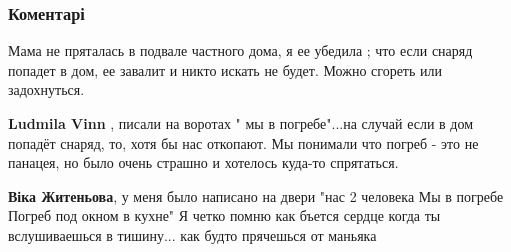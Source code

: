  
 
 
 
 
\subsubsection{Коментарі}
\label{sec:21_07_2021.fb.zhitenjova_vika.1.gorlovka.cmt}

\begin{itemize}
 

Мама не пряталась в подвале частного дома, я ее убедила ; что если снаряд
попадет в дом, ее завалит и никто искать не будет. Можно сгореть или
задохнуться.

\begin{itemize}
 
\textbf{Ludmila Vinn} , писали на воротах " мы в погребе"...на случай если в дом попадёт снаряд, то, хотя бы нас откопают. Мы понимали что погреб - это не панацея, но было очень страшно и хотелось куда-то спрятаться.

 
\textbf{Віка Житеньова}, у меня было написано на двери "нас 2 человека
Мы в погребе
Погреб под окном в кухне"
Я четко помню как бъется сердце когда ты вслушиваешься в тишину... как будто прячешься от маньяка

 

\end{itemize}
\end{itemize}
